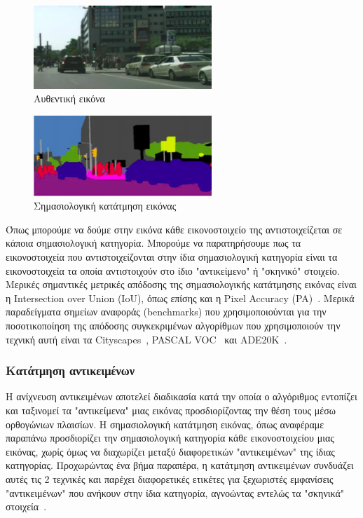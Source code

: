\documentclass[12pt]{article}
\numberwithin{equation}{section}
\begin{document}
\begin{figure}[h!]
  \centering
  \includegraphics[width=0.60\textwidth]{images/figure0.png} %
  \caption{Αυθεντική εικόνα}
  \label{figure 1}
\end{figure}

\begin{figure}[h!]
  \centering
  \includegraphics[width=0.6\textwidth]{images/figure1.png} %
  \caption{Σημασιολογική κατάτμηση εικόνας}
  \label{figure 2}
\end{figure}

Όπως μπορούμε να δούμε στην εικόνα κάθε εικονοστοιχείο της αντιστοιχείζεται σε κάποια σημασιολογική κατηγορία. Μπορούμε να παρατηρήσουμε πως τα εικονοστοιχεία που αντιστοιχείζονται στην ίδια σημασιολογική κατηγορία είναι τα εικονοστοιχεία τα οποία αντιστοιχούν στο ίδιο "αντικείμενο" ή "σκηνικό" στοιχείο. \\

Μερικές σημαντικές μετρικές απόδοσης της σημασιολογικής κατάτμησης εικόνας είναι η Intersection over Union (IoU), όπως επίσης και η Pixel Accuracy (PA)~\cite{DBLP:journals/corr/abs-2001-05566}. Μερικά παραδείγματα σημείων αναφοράς (benchmarks) που χρησιμοποιούνται για την ποσοτικοποίηση της απόδοσης συγκεκριμένων αλγορίθμων που χρησιμοποιούν την τεχνική αυτή είναι τα Cityscapes~\cite{DBLP:journals/corr/CordtsORREBFRS16}, PASCAL VOC~\cite{Everingham2010} και ADE20K~\cite{8100027}. \\

\subsubsection{Κατάτμηση αντικειμένων}
Η ανίχνευση αντικειμένων αποτελεί διαδικασία κατά την οποία ο αλγόριθμος εντοπίζει και ταξινομεί τα "αντικείμενα" μιας εικόνας προσδιορίζοντας την θέση τους μέσω ορθογώνιων πλαισίων. Η σημασιολογική κατάτμηση εικόνας, όπως αναφέραμε παραπάνω προσδιορίζει την σημασιολογική κατηγορία κάθε εικονοστοιχείου μιας εικόνας, χωρίς όμως να διαχωρίζει μεταξύ διαφορετικών "αντικειμένων" της ίδιας κατηγορίας. Προχωρώντας ένα βήμα παραπέρα, η κατάτμηση αντικειμένων συνδυάζει αυτές τις 2 τεχνικές και παρέχει διαφορετικές ετικέτες για ξεχωριστές εμφανίσεις "αντικειμένων" που ανήκουν στην ίδια κατηγορία, αγνοώντας εντελώς τα "σκηνικά" στοιχεία~\cite{Hafiz_2020}. \\
\end{document}

